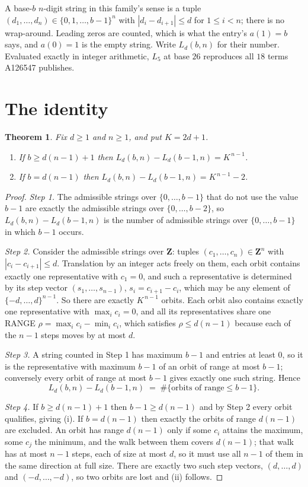 \documentclass[11pt,a4paper]{article}
\theoremstyle{plain}
\newtheorem{theorem}{Theorem}
\theoremstyle{definition}
\begin{document}
A base-$b$ $n$-digit string in this family's sense is a tuple
$(d_1,\dots,d_n)\in\{0,1,\dots,b-1\}^{n}$ with $|d_i-d_{i+1}|\le d$ for $1\le i<n$; there
is no wrap-around. Leading zeros are counted, which is what the entry's $a(1)=b$ says, and
$a(0)=1$ is the empty string. Write $L_d(b,n)$ for their number. Evaluated exactly in integer
arithmetic, $L_{5}$ at base $26$ reproduces all $18$ terms A126547 publishes.

\section{The identity}

\begin{theorem}
Fix $d\ge1$ and $n\ge1$, and put $K=2d+1$.
\begin{enumerate}
\item[(i)] If $b\ge d(n-1)+1$ then $L_d(b,n)-L_d(b-1,n)=K^{\,n-1}$.
\item[(ii)] If $b=d(n-1)$ then $L_d(b,n)-L_d(b-1,n)=K^{\,n-1}-2$.
\end{enumerate}
\end{theorem}

\begin{proof}
\emph{Step 1.} The admissible strings over $\{0,\dots,b-1\}$ that do not use the value $b-1$
are exactly the admissible strings over $\{0,\dots,b-2\}$, so $L_d(b,n)-L_d(b-1,n)$ is the
number of admissible strings over $\{0,\dots,b-1\}$ in which $b-1$ occurs.

\emph{Step 2.} Consider the admissible strings over $\mathbf{Z}$: tuples
$(c_1,\dots,c_n)\in\mathbf{Z}^{n}$ with $|c_i-c_{i+1}|\le d$. Translation by an integer acts
freely on them, each orbit contains exactly one representative with $c_1=0$, and such a
representative is determined by its step vector $(s_1,\dots,s_{n-1})$, $s_i=c_{i+1}-c_i$,
which may be any element of $\{-d,\dots,d\}^{n-1}$. So there are exactly $K^{\,n-1}$ orbits.
Each orbit also contains exactly one representative with $\max_i c_i=0$, and all its
representatives share one RANGE $\rho=\max_ic_i-\min_ic_i$, which satisfies
$\rho\le d(n-1)$ because each of the $n-1$ steps moves by at most $d$.

\emph{Step 3.} A string counted in Step 1 has maximum $b-1$ and entries at least $0$, so it is
the representative with maximum $b-1$ of an orbit of range at most $b-1$; conversely every orbit
of range at most $b-1$ gives exactly one such string. Hence
\[
L_d(b,n)-L_d(b-1,n)\;=\;\#\{\text{orbits of range}\le b-1\} .
\]

\emph{Step 4.} If $b\ge d(n-1)+1$ then $b-1\ge d(n-1)$ and by Step 2 every orbit qualifies,
giving (i). If $b=d(n-1)$ then exactly the orbits of range $d(n-1)$ are excluded. An orbit has
range $d(n-1)$ only if some $c_i$ attains the maximum, some $c_j$ the minimum, and the walk
between them covers $d(n-1)$; that walk has at most $n-1$ steps, each of size at most $d$, so it
must use all $n-1$ of them in the same direction at full size. There are exactly two such step
vectors, $(d,\dots,d)$ and $(-d,\dots,-d)$, so two orbits are lost and (ii) follows.
\end{proof}
\end{document}
